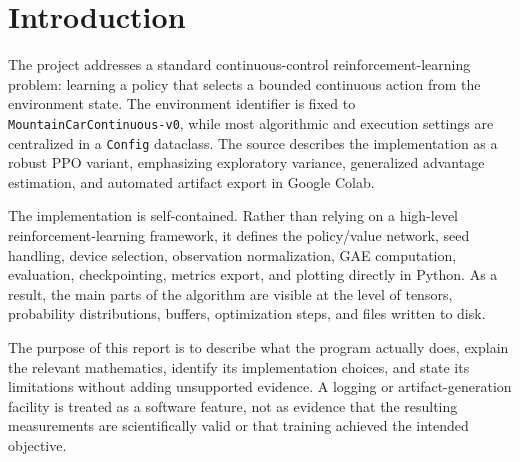 \documentclass[11pt,a4paper]{article}
\begin{document}
\section{Introduction}
The project addresses a standard continuous-control reinforcement-learning problem: learning a policy that selects a bounded continuous action from the environment state. The environment identifier is fixed to \texttt{MountainCarContinuous-v0}, while most algorithmic and execution settings are centralized in a \texttt{Config} dataclass. The source describes the implementation as a robust PPO variant, emphasizing exploratory variance, generalized advantage estimation, and automated artifact export in Google Colab.

The implementation is self-contained. Rather than relying on a high-level reinforcement-learning framework, it defines the policy/value network, seed handling, device selection, observation normalization, GAE computation, evaluation, checkpointing, metrics export, and plotting directly in Python. As a result, the main parts of the algorithm are visible at the level of tensors, probability distributions, buffers, optimization steps, and files written to disk.

The purpose of this report is to describe what the program actually does, explain the relevant mathematics, identify its implementation choices, and state its limitations without adding unsupported evidence. A logging or artifact-generation facility is treated as a software feature, not as evidence that the resulting measurements are scientifically valid or that training achieved the intended objective.
\end{document}
